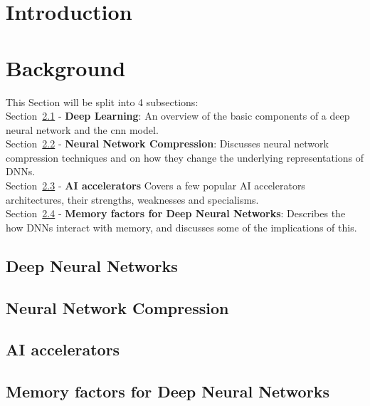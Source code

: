 \documentclass[11pt]{article}
\begin{document}
\printnoidxglossary[type=acronym, nonumberlist]
\thispagestyle{empty}

\newpage
\setcounter{page}{1}

\section{Introduction}


\pagebreak
\section{Background}
This Section will be split into 4 subsections:\\
Section~\ref{subsec:deepLearning} - \textbf{Deep Learning}: An overview of the basic components of a deep neural network and the \acrshort{cnn} model.\\
Section~\ref{subsec:compressionTypes} - \textbf{Neural Network Compression}: Discusses neural network compression techniques and on how they change the underlying representations of DNNs.\\
Section~\ref{subsec:AIaccelerators} - \textbf{AI accelerators} Covers a few popular AI accelerators architectures, their strengths, weaknesses and specialisms.\\
Section~\ref{subsec:hardwareArch} - \textbf{Memory factors for Deep Neural Networks}: Describes the how DNNs interact with memory, and discusses some of the implications of this.

\subsection{Deep Neural Networks}\label{subsec:deepLearning}


\newpage
\subsection{Neural Network Compression}\label{subsec:compressionTypes}


\newpage
\subsection{AI accelerators}\label{subsec:AIaccelerators}


\newpage
\subsection{Memory factors for Deep Neural Networks}\label{subsec:hardwareArch}

\end{document}
